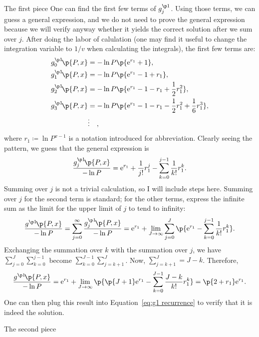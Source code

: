 \documentclass[oneside,12pt,final]{ucthesis-CA2012}
\newcommand{\mrm}[1]{\mathrm{#1}}
\newcommand{\ceq}{\coloneqq}
\newcommand{\e}{\mrm{e}}
\newcommand{\fr}{\frac}
\newcommand{\fc}[2]{#1\mathchoice{\!}{\!}{}{}\p{#2}} %
\begin{document}
\begin{mainmatter}
\begin{section}{The first piece}
One can find the first few terms of $g^{\p1}_j$.
Using those terms, we can guess a general expression, and we do not need to prove the general expression
because we will verify anyway whether it yields the correct solution after we sum over $j$.
After doing the labor of calulation (one may find it useful to change the integration variable to $1/v$
when calculating the integrals), the first few terms are:
\begin{align*}
	\fc{g^{\p1}_0}{P,x}&=-\ln P\p{\e^{r_1}+1},\\
	\fc{g^{\p1}_1}{P,x}&=-\ln P\p{\e^{r_1}-1+r_1},\\
	\fc{g^{\p1}_2}{P,x}&=-\ln P\p{\e^{r_1}-1-r_1+\frac12r_1^2},\\
	\fc{g^{\p1}_3}{P,x}&=-\ln P\p{\e^{r_1}-1-r_1-\frac12r_1^2+\frac16r_1^3},\\
	&\vdots\quad,
\end{align*}
where $r_1\ceq\ln P^{x-1}$ is a notation introduced for abbreviation.
Clearly seeing the pattern, we guess that the general expression is
\[\fr{\fc{g^{\p1}_j}{P,x}}{-\ln P}=\e^{r_1}+\fr1{j!}r_1^j-\sum_{k=0}^{j-1}\frac1{k!}r_1^k.\]
Summing over $j$ is not a trivial calculation, so I will include steps here.
Summing over $j$ for the second term is standard;
for the other terms, express the infinite sum as the limit for the upper limit of $j$ to tend to infinity:
\[\fr{\fc{g^{\p1}}{P,x}}{-\ln P}=\sum_{j=0}^\infty\fr{\fc{g^{\p1}_j}{P,x}}{-\ln P}
=\e^{r_1}+\lim_{J\to\infty}\sum_{j=0}^J\p{\e^{r_1}-\sum_{k=0}^{j-1}\fr1{k!}r_1^k}.\]
Exchanging the summation over $k$ with the summation over $j$, we have
$\sum_{j=0}^J\sum_{k=0}^{j-1}$ become $\sum_{k=0}^{J-1}\sum_{j=k+1}^J$.
Now, $\sum_{j=k+1}^J=J-k$. Therefore,
\begin{equation}
	\label{eq:g1 solution}
	\fr{\fc{g^{\p1}}{P,x}}{-\ln P}=\e^{r_1}+\lim_{J\to\infty}\p{\p{J+1}\e^{r_1}-\sum_{k=0}^{J-1}\fr{J-k}{k!}r_1^k}
	=\p{2+r_1}\e^{r_1}.
\end{equation}
One can then plug this result into Equation~\ref{eq:g1 recurrence} to verify that it is indeed the solution.

\end{section}
\begin{section}{The second piece}
\label{sec:g2}


\end{section}
\end{mainmatter}
\end{document}
